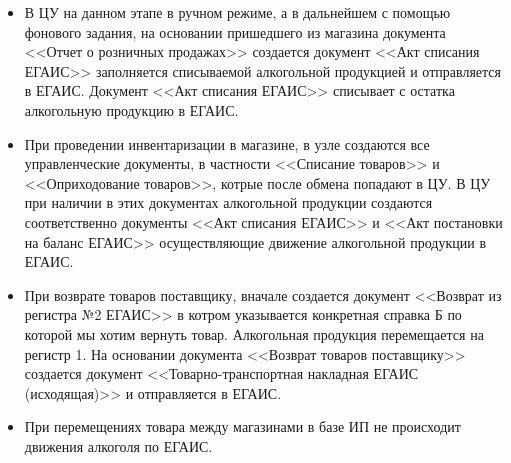 \begin{itemize}
     \item В ЦУ на данном этапе в ручном режиме, а в дальнейшем с помощью фонового задания, на основании пришедшего из магазина документа <<Отчет о розничных продажах>>  создается документ  <<Акт списания ЕГАИС>> заполняется списываемой алкогольной продукцией  и отправляется в ЕГАИС. Документ <<Акт списания ЕГАИС>> списывает с остатка алкогольную продукцию в ЕГАИС.
     \item При проведении инвентаризации в магазине, в узле создаются все управленческие документы, в частности <<Списание товаров>> и <<Оприходование товаров>>, котрые после обмена попадают в ЦУ. В ЦУ при наличии в этих документах алкогольной продукции создаются соответственно документы <<Акт списания ЕГАИС>> и <<Акт постановки на баланс ЕГАИС>> осуществляющие движение алкогольной продукции в ЕГАИС.
     \item При возврате товаров поставщику,  вначале создается документ <<Возврат из регистра №2 ЕГАИС>>  в котром указывается конкретная справка Б по которой мы хотим вернуть товар. Алкогольная продукция перемещается на регистр 1. На основании документа <<Возврат товаров поставщику>> создается документ <<Товарно-транспортная накладная ЕГАИС (исходящая)>> и отправляется в ЕГАИС.
      \item При перемещениях товара между магазинами в базе ИП не происходит движения алкоголя по ЕГАИС.

 \end{itemize}
